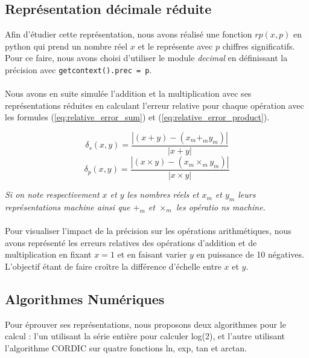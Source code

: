 \documentclass{article}
\begin{document}
\subsection{Représentation décimale réduite}
Afin d'étudier cette représentation, nous avons réalisé une fonction $rp(x, p)$ en python qui prend un nombre réel $x$ et le représente avec $p$ chiffres significatifs.\\
Pour ce faire, nous avons choisi d'utiliser le module \textit{decimal} en définissant la précision avec \texttt{getcontext().prec = p}.\\ \\
Nous avons en suite simulée l’addition et la multiplication avec ses représentations réduites en calculant l'erreur relative pour chaque opération avec les formules (\ref{eq:relative_error_sum}) et (\ref{eq:relative_error_product}).\\
\vspace{-0.8cm}
\begin{multicols}{2}
\vspace{-0.5cm}
\begin{equation}
\delta_s(x,y) = \frac{|(x + y) - (x_{m} +_{m} y_{m})|}{|x + y|}
\label{eq:relative_error_sum}
\end{equation}
\vspace{0.5cm}
\begin{equation}
\delta_p(x,y) = \frac{|(x \times y) - (x_{m} \times_{m} y_{m})|}{|x \times y|}
\label{eq:relative_error_product}
\end{equation}
\end{multicols}
\textit{\noindent Si on note respectivement  $x$ et $y$ les nombres réels et $x_m$ et $y_m$ leurs représentations machine ainsi que $+_{m}$ et $\times_{m}$ les opératio
ns machine.}\\ \\
Pour visualiser l'impact de la précision sur les opérations arithmétiques, nous avons représenté les erreurs relatives des opérations d'addition et de multiplication en fixant $x =1$ et en faisant varier $y$ en puissance de 10 négatives. L'objectif étant de faire croître la différence d'échelle entre $x$ et $y$.

\subsection{Algorithmes Numériques}
Pour éprouver ses représentations, nous proposons deux algorithmes pour le calcul : l'un utilisant la série entière pour calculer log(2), et l'autre utilisant l'algorithme CORDIC sur quatre fonctions ln, exp, tan et arctan.
\end{document}
